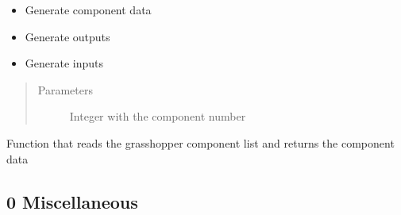 \documentclass[letterpaper,10pt,english]{sphinxmanual}
\begin{document}
\begin{fulllineitems}
\begin{fulllineitems}
\begin{itemize}
\item {} 
Generate component data

\item {} 
Generate outputs

\item {} 
Generate inputs

\end{itemize}
\begin{quote}\begin{description}
\item[{Parameters}] \leavevmode
{} \textendash{} Integer with the component number

\end{description}\end{quote}

\end{fulllineitems}


\end{fulllineitems}


\begin{fulllineitems}
\label{\detokenize{superclass:livestock.components.component.component_data}}
Function that reads the grasshopper component list and returns the component data

\end{fulllineitems}







\subsection{0 \textbar{} Miscellaneous}
\label{\detokenize{miscellaneous:module-livestock.components.misc}}\label{\detokenize{miscellaneous::doc}}\label{\detokenize{miscellaneous:miscellaneous}}\label{\detokenize{miscellaneous:id3}}
\end{document}
